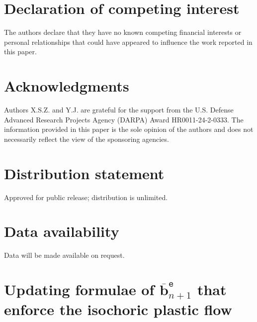 \documentclass[preprint,11pt]{elsarticle}
\theoremstyle{definition}
\begin{document}
\section*{Declaration of competing interest}
The authors declare that they have no known competing financial interests or personal relationships that could have appeared to influence the work reported in this paper.


\section*{Acknowledgments}
Authors X.S.Z. and Y.J. are grateful for the support from the U.S. Defense Advanced Research Projects Agency (DARPA) Award HR0011-24-2-0333. The information provided in this paper is the sole opinion of the authors and does not necessarily reflect the view of the sponsoring agencies.

\section*{Distribution statement}
Approved for public release; distribution is unlimited.

\section*{Data availability}
Data will be made available on request.


\appendix

\section[]{Updating formulae of $\overline{\mathbf{b}}_{n+1}^\texttt{e}$ that enforce the isochoric plastic flow}
\label{Sec: Derivation of Updating Formula of be_bar}
\end{document}

